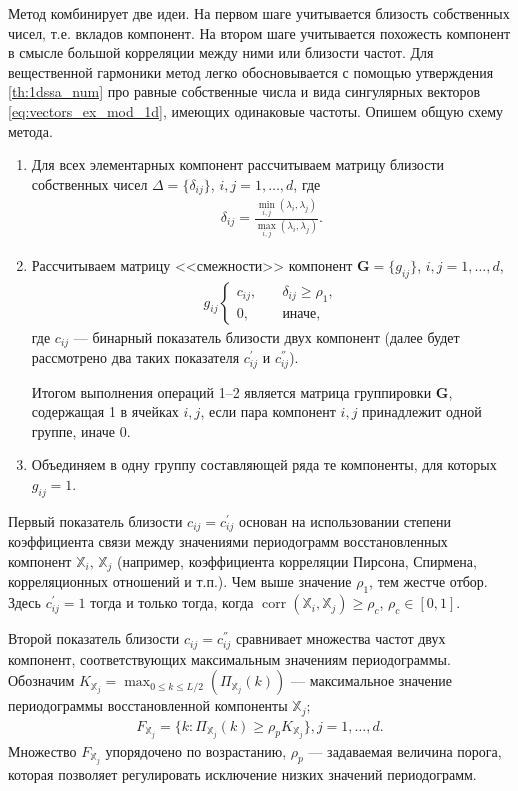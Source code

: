 \documentclass[specialist,
               substylefile = spbu.rtx,
               subf,href,colorlinks=true, 12pt]{disser}
\def\corr{\mathop{\mathrm{corr}}}
\begin{document}
Метод комбинирует две идеи. На первом шаге учитывается близость собственных чисел, т.е. вкладов компонент. На втором шаге учитывается похожесть компонент в смысле большой корреляции между ними или близости частот.
Для вещественной гармоники метод легко обосновывается с помощью утверждения \ref{th:1dssa_num} про равные собственные числа и вида сингулярных векторов \eqref{eq:vectors_ex_mod_1d}, имеющих одинаковые частоты.
Опишем общую схему метода.
\begin{enumerate}
\item Для всех элементарных компонент рассчитываем матрицу близости собственных чисел $\Delta = \{\delta_{ij}\}$, $i,j=1,\ldots,d$, где
\begin{gather}
\label{eq:delta}
\delta_{ij} = \frac{\min_{i, j}(\lambda_i, \lambda_j)}{\max_{i,j}(\lambda_i, \lambda_j)}.
\end{gather}
\item Рассчитываем матрицу <<смежности>> компонент $\mathbf{G}=\{g_{ij}\}$, $i,j = 1,\ldots,d$,
\begin{gather} \label{eq:g_ij}
g_{ij}
\begin{cases}
c_{ij}, &\quad \delta_{ij} \geqslant \rho_1, \\
0, &\quad \text{иначе},
\end{cases}
\end{gather}
где $c_{ij}$ --- бинарный показатель близости двух компонент (далее будет рассмотрено два таких показателя  $c^{'}_{ij}$ и  $c^{''}_{ij}$).

Итогом выполнения операций 1--2 является матрица группировки $\mathbf{G}$, содержащая 1 в ячейках $i,j$, если пара компонент $i,j$ принадлежит одной группе, иначе 0.
\item Объединяем в одну группу составляющей ряда те  компоненты, для которых $g_{ij} = 1$.
\end{enumerate}

Первый показатель близости $c_{ij} = c^{'}_{ij}$ основан на использовании
степени коэффициента связи между значениями периодограмм восстановленных компонент $\mathbb{X}_i$, $\mathbb{X}_j$ (например, коэффициента корреляции Пирсона, Спирмена, корреляционных отношений и т.п.). Чем выше значение $\rho_1$, тем жестче отбор.
Здесь $c^{'}_{ij} = 1$ тогда и только тогда, когда $\corr(\mathbb{X}_i, \mathbb{X}_j) \geqslant \rho_c$, $\rho_c \in [0,1]$.

Второй показатель близости $c_{ij} =c^{''}_{ij}$ сравнивает множества частот двух компонент, соответствующих максимальным значениям периодограммы.
Обозначим
$K_{\mathbb{X}_j} = \max_{0\leqslant k \leqslant L/2}\left(\Pi_{\mathbb{X}_j}(k)\right)$ --- максимальное значение периодограммы восстановленной компоненты $\mathbb{X}_j$;
\begin{gather} \label{eq:f_j}
F_{\mathbb{X}_j} =  \{ k: \Pi_{\mathbb{X}_j}(k) \geqslant \rho_p K_{\mathbb{X}_j}  \}, j = 1,\ldots, d.
\end{gather}
Множество $F_{\mathbb{X}_j}$ упорядочено по возрастанию, $\rho_p$ --- задаваемая величина порога, которая позволяет регулировать исключение низких значений периодограмм.
\end{document}

